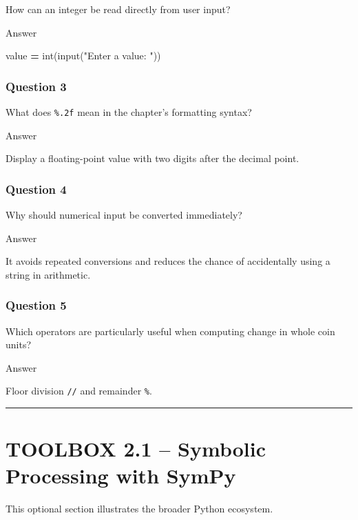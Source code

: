 \documentclass[
]{article}
\newenvironment{Shaded}{\begin{snugshade}}{\end{snugshade}}
\newcommand{\BuiltInTok}[1]{#1}
\newcommand{\NormalTok}[1]{#1}
\newcommand{\OperatorTok}[1]{\textcolor[rgb]{0.81,0.36,0.00}{\textbf{#1}}}
\newcommand{\StringTok}[1]{\textcolor[rgb]{0.31,0.60,0.02}{#1}}
\begin{document}
How can an integer be read directly from user input?

Answer

\begin{Shaded}
\begin{Highlighting}[]
\NormalTok{value }\OperatorTok{=} \BuiltInTok{int}\NormalTok{(}\BuiltInTok{input}\NormalTok{(}\StringTok{"Enter a value: "}\NormalTok{))}
\end{Highlighting}
\end{Shaded}

\subsubsection{Question 3}\label{question-3-4}

What does \texttt{\%.2f} mean in the chapter's formatting syntax?

Answer

Display a floating-point value with two digits after the decimal point.

\subsubsection{Question 4}\label{question-4-3}

Why should numerical input be converted immediately?

Answer

It avoids repeated conversions and reduces the chance of accidentally
using a string in arithmetic.

\subsubsection{Question 5}\label{question-5-3}

Which operators are particularly useful when computing change in whole
coin units?

Answer

Floor division \texttt{//} and remainder \texttt{\%}.

\begin{center}\rule{0.5\linewidth}{0.5pt}\end{center}

\section{TOOLBOX 2.1 -- Symbolic Processing with
SymPy}\label{toolbox-2.1-symbolic-processing-with-sympy}

This optional section illustrates the broader Python ecosystem.
\end{document}
